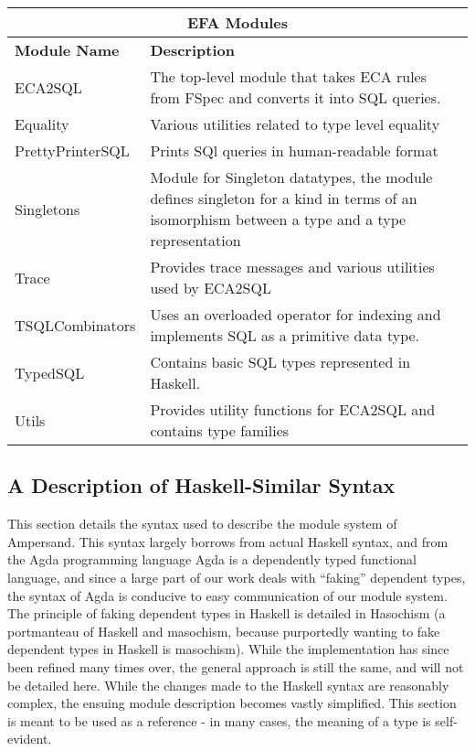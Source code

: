 \begin{adjustbox}{center}
    \begin{tabular}{ |p{3.2cm}|p{11cm}|  }
        \hline
        \multicolumn{2}{|c|}{\bfseries{\large{EFA Modules}}} \\
        \hline\hline
        \bfseries{Module Name} & \bfseries{Description}\\
        \hline
        ECA2SQL & The top-level module that takes ECA rules from FSpec and 
        converts it into SQL queries.    \\ 
        \hline
        Equality & Various utilities related to type level equality   \\ 
        \hline
        PrettyPrinterSQL & Prints SQl queries in human-readable format    \\ 
        \hline
        Singletons & Module for Singleton datatypes, the module defines 
        singleton for a kind in terms of an isomorphism between a type and a 
        type representation   \\ 
        \hline
        Trace & Provides trace messages and various utilities used by 
        ECA2SQL    \\ 
        \hline
        TSQLCombinators & Uses an overloaded operator for indexing and 
        implements SQL as a primitive data type.   \\ 
        \hline
        TypedSQL & Contains basic SQL types represented in Haskell.    \\ 
        \hline
        Utils & Provides utility functions for ECA2SQL and contains type 
        families    \\ 
        \hline
    \end{tabular}
\end{adjustbox}

\noindent
\subsection{A Description of Haskell-Similar Syntax}\label{subsec:HaskellSyntax}

This section details the syntax used to describe the module system of
Ampersand. This syntax largely borrows from actual Haskell syntax, and from the
Agda programming language%
 Agda is a dependently typed functional
language, and since a large part of our work deals with ``faking'' dependent
types, the syntax of Agda is conducive to easy communication of our module 
system. The
principle of faking dependent types in Haskell is detailed in
Hasochism \citep{hasochism} 
(a portmanteau of Haskell and masochism, because
purportedly wanting to fake dependent types in Haskell is masochism). While the
implementation has since been refined many times over, the general approach is 
still the
same, and will not be detailed here.
While the changes made to the Haskell syntax are reasonably complex, the 
ensuing 
module description becomes vastly simplified. This section is meant to be used
as a reference - in many cases, the meaning of a type is self-evident. 

